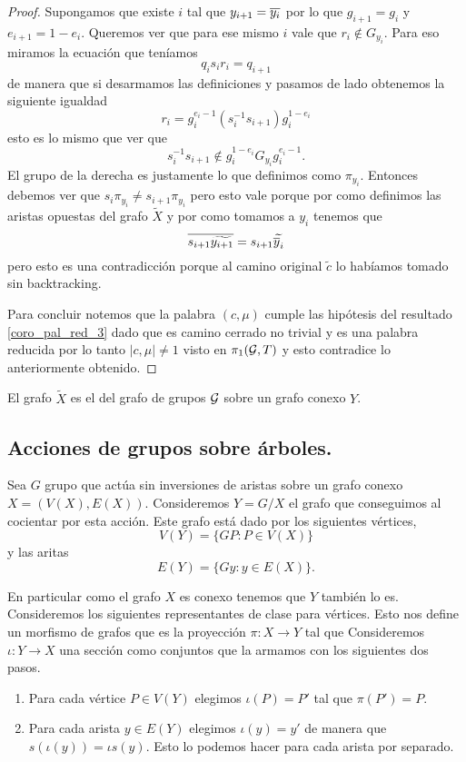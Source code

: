\documentclass[tesis.tex]{subfiles}
\begin{document}
\begin{proof}
	Supongamos que existe $i$ tal que $y_{i+1} = \overline{y_i}$ por lo que $g_{i+1} = g_{i}$ y $e_{i+1} = 1 - e_i$.
	Queremos ver que para ese mismo $i$ vale que $r_i \notin G_{y_i}$.
	Para eso miramos la ecuación que teníamos 
	\[
		q_is_ir_i = q_{i+1}
	\]
	de manera que si desarmamos las definiciones y pasamos de lado obtenemos la siguiente igualdad
	\[
		r_i = g_i^{e_i - 1} (s_i^{-1} s_{i+1}) g_i^{1-e_i}
	\]
	esto es lo mismo que ver que 
	\[
		s_i^{-1}s_{i+1} \notin g_i^{1-e_i}G_{y_i} g_i^{e_i - 1}.
	\]
	El grupo de la derecha es justamente lo que definimos como $\pi_{y_i}$.
	Entonces debemos ver que $s_i\pi_{y_i} \neq s_{i+1} \pi_{y_i}$ pero esto vale porque por como definimos las aristas opuestas del grafo $\tilde X$ y por como tomamos a $y_i$ tenemos que 
	\[
	\overline{s_{i+1} \widetilde{y_{i+1}}} = s_{i+1} \widetilde{\overline y_i} 
	\]
	pero esto es una contradicción porque al camino original $\tilde c$ lo habíamos tomado sin backtracking.
	
	Para concluir notemos que la palabra $(c, \mu)$ cumple las hipótesis del resultado \ref{coro_pal_red_3} dado que es camino cerrado no trivial y es una palabra reducida por lo tanto $|c, \mu| \neq 1$ visto en $\pi_1({\cal G}, T)$ y esto contradice lo anteriormente obtenido.
\end{proof}


\begin{deff}
	El grafo $\tilde X$ es el  del grafo de grupos ${\cal G}$ sobre un grafo conexo $Y$.
\end{deff}

%

\subsection{Acciones de grupos sobre árboles.}

Sea $G$ grupo que actúa sin inversiones de aristas sobre un grafo conexo $X = (V(X),E(X))$.
Consideremos $Y = G / X$ el grafo que conseguimos al cocientar por esta acción.
Este grafo está dado por los siguientes vértices,
\[
	V(Y) = \{ G P :  P \in V(X)    \}
\]
y las  aritas 
\[
	E(Y) = \{  Gy  : y \in E(X)  \}.
\]

En particular como el grafo $X$ es conexo tenemos que $Y$ también lo es.
Consideremos los siguientes representantes de clase para vértices. 
Esto nos define un morfismo de grafos que es la proyección $\pi: X \to Y$ tal que
Consideremos $\iota: Y \to X$ una sección como conjuntos que la armamos con los siguientes dos pasos.
\begin{enumerate}
	\item Para cada vértice $P \in V(Y)$ elegimos $\iota (P) = P'$ tal que $\pi(P') = P$.
	\item Para cada arista $y \in E(Y)$ elegimos $\iota(y) = y'$ de manera que $s(\iota(y)) = \iota s(y)$. 
	Esto lo podemos hacer para cada arista por separado.
\end{enumerate}
\end{document}
